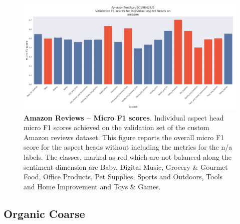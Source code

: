 \begin{figure}[H]
    \centering
    \includegraphics[width=\textwidth]{figures/08_appendix/08_am_headResults}
    \caption{\textbf{Amazon Reviews -- Micro F1 scores}. Individual aspect head micro F1 scores achieved on the validation set of the custom Amazon reviews dataset. This figure reports the overall micro F1 score for the aspect heads without including the metrics for the n/a labels. The classes, marked as red which are not balanced along the sentiment dimension are Baby, Digital Music, Grocery \& Gourmet Food, Office Products, Pet Supplies, Sports and Outdoors, Tools and Home Improvement and Toys \& Games.}
    \label{fig:08_am_val_f1}
\end{figure}

\subsection{Organic Coarse}

